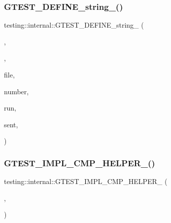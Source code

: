 \subsubsection{\texorpdfstring{GTEST\_DEFINE\_string\_()}{GTEST\_DEFINE\_string\_()}}
{\footnotesize\ttfamily testing\+::internal\+::\+G\+T\+E\+S\+T\+\_\+\+D\+E\+F\+I\+N\+E\+\_\+string\+\_\+ (\begin{DoxyParamCaption}\item[{internal\+\_\+run\+\_\+death\+\_\+test}]{,  }\item[{\char`\"{}\char`\"{}}]{,  }\item[{\char`\"{}Indicates the}]{file,  }\item[{line}]{number,  }\item[{temporal index of \char`\"{} \char`\"{}the single death test to}]{run,  }\item[{and a file descriptor to \char`\"{} \char`\"{}which a success code may be}]{sent,  }\item[{all separated by \char`\"{} \char`\"{}the \textquotesingle{}$\vert$\textquotesingle{} characters. This flag is specified if and only if the current \char`\"{} \char`\"{}process is a sub-\/process launched for running a thread-\/safe \char`\"{} \char`\"{}death test. F\+OR I\+N\+T\+E\+R\+N\+AL U\+SE O\+N\+L\+Y.\char`\"{}}]{ }\end{DoxyParamCaption})}

\mbox{\label{namespacetesting_1_1internal_aa14e3caa94126d7fb8e06bfb3d24ae4a}} 
\subsubsection{\texorpdfstring{GTEST\_IMPL\_CMP\_HELPER\_()}{GTEST\_IMPL\_CMP\_HELPER\_()}\hspace{0.1cm}{\footnotesize\ttfamily [1/5]}}
{\footnotesize\ttfamily testing\+::internal\+::\+G\+T\+E\+S\+T\+\_\+\+I\+M\+P\+L\+\_\+\+C\+M\+P\+\_\+\+H\+E\+L\+P\+E\+R\+\_\+ (\begin{DoxyParamCaption}\item[{NE}]{,  }\item[{!}]{ }\end{DoxyParamCaption})}

\mbox{\label{namespacetesting_1_1internal_ade60646b18728043fff84d7b4125de2c}} 
